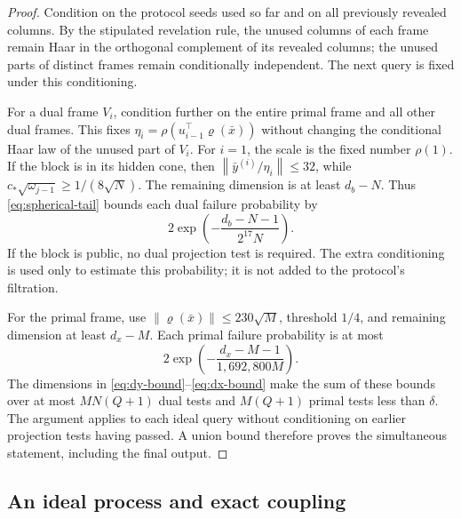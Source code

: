 \documentclass[11pt,a4paper]{article}
\newcommand{\norm}[1]{\left\lVert #1\right\rVert}
\theoremstyle{definition}
\theoremstyle{remark}
\numberwithin{equation}{section}
\begin{document}
\begin{proof}
Condition on the protocol seeds used so far and on all previously revealed
columns.  By the stipulated revelation rule, the unused columns of each
frame remain Haar in the orthogonal complement of its revealed columns;
the unused parts of distinct frames remain conditionally independent.
The next query is fixed under this conditioning.

For a dual frame $V_i$, condition further on the entire primal frame and
all other dual frames.  This fixes
$\eta_i=\rho(u_{i-1}^\top\varrho(\bar x))$ without changing the conditional
Haar law of the unused part of $V_i$.  For $i=1$, the scale is the fixed
number $\rho(1)$.  If the block is in its hidden cone, then
$\norm{\bar y^{(i)}/\eta_i}\le32$, while
$c_*\sqrt{\omega_{j-1}}\ge1/(8\sqrt N)$.  The remaining dimension is at
least $d_b-N$.  Thus \eqref{eq:spherical-tail} bounds each dual failure
probability by
\[
 2\exp\!\left(-\frac{d_b-N-1}{2^{17}N}\right).
\]
If the block is public, no dual projection test is required.  The extra
conditioning is used only to estimate this probability; it is not added
to the protocol's filtration.

For the primal frame, use
$\norm{\varrho(\bar x)}\le230\sqrt M$, threshold $1/4$, and remaining
dimension at least $d_x-M$.  Each primal failure probability is at most
\[
 2\exp\!\left(-\frac{d_x-M-1}{1{,}692{,}800M}\right).
\]
The dimensions in \eqref{eq:dy-bound}--\eqref{eq:dx-bound} make the sum of
these bounds over at most $MN(Q+1)$ dual tests and $M(Q+1)$ primal tests
less than $\delta$.  The argument applies to each ideal query without
conditioning on earlier projection tests having passed.  A union bound
therefore proves the simultaneous statement, including the final output.
\end{proof}

\subsection{An ideal process and exact coupling}
\end{document}

